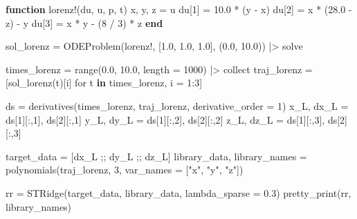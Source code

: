 \documentclass[
]{article}
\newenvironment{Shaded}{\begin{snugshade}}{\end{snugshade}}
\newcommand{\FloatTok}[1]{\textcolor[rgb]{0.68,0.00,0.00}{#1}}
\newcommand{\FunctionTok}[1]{\textcolor[rgb]{0.28,0.35,0.67}{#1}}
\newcommand{\KeywordTok}[1]{\textcolor[rgb]{0.00,0.23,0.31}{\textbf{#1}}}
\newcommand{\NormalTok}[1]{\textcolor[rgb]{0.00,0.23,0.31}{#1}}
\newcommand{\OperatorTok}[1]{\textcolor[rgb]{0.37,0.37,0.37}{#1}}
\newcommand{\StringTok}[1]{\textcolor[rgb]{0.13,0.47,0.30}{#1}}
\begin{document}
\begin{Shaded}
\begin{Highlighting}[]
\KeywordTok{function} \FunctionTok{lorenz!}\NormalTok{(du, u, p, t)}
\NormalTok{    x, y, z }\OperatorTok{=}\NormalTok{ u}
\NormalTok{    du[}\FloatTok{1}\NormalTok{] }\OperatorTok{=} \FloatTok{10.0} \OperatorTok{*}\NormalTok{ (y }\OperatorTok{{-}}\NormalTok{ x)}
\NormalTok{    du[}\FloatTok{2}\NormalTok{] }\OperatorTok{=}\NormalTok{ x }\OperatorTok{*}\NormalTok{ (}\FloatTok{28.0} \OperatorTok{{-}}\NormalTok{ z) }\OperatorTok{{-}}\NormalTok{ y}
\NormalTok{    du[}\FloatTok{3}\NormalTok{] }\OperatorTok{=}\NormalTok{ x }\OperatorTok{*}\NormalTok{ y }\OperatorTok{{-}}\NormalTok{ (}\FloatTok{8} \OperatorTok{/} \FloatTok{3}\NormalTok{) }\OperatorTok{*}\NormalTok{ z}
\KeywordTok{end}

\NormalTok{sol\_lorenz }\OperatorTok{=} \FunctionTok{ODEProblem}\NormalTok{(lorenz!, [}\FloatTok{1.0}\NormalTok{, }\FloatTok{1.0}\NormalTok{, }\FloatTok{1.0}\NormalTok{], (}\FloatTok{0.0}\NormalTok{, }\FloatTok{10.0}\NormalTok{)) }\OperatorTok{|\textgreater{}}\NormalTok{ solve}

\NormalTok{times\_lorenz }\OperatorTok{=} \FunctionTok{range}\NormalTok{(}\FloatTok{0.0}\NormalTok{, }\FloatTok{10.0}\NormalTok{, length }\OperatorTok{=} \FloatTok{1000}\NormalTok{) }\OperatorTok{|\textgreater{}}\NormalTok{ collect}
\NormalTok{traj\_lorenz }\OperatorTok{=}\NormalTok{ [}\FunctionTok{sol\_lorenz}\NormalTok{(t)[i] for t }\KeywordTok{in}\NormalTok{ times\_lorenz, i }\OperatorTok{=} \FloatTok{1}\OperatorTok{:}\FloatTok{3}\NormalTok{]}

\NormalTok{ds }\OperatorTok{=} \FunctionTok{derivatives}\NormalTok{(times\_lorenz, traj\_lorenz, derivative\_order }\OperatorTok{=} \FloatTok{1}\NormalTok{)}
\NormalTok{x\_L, dx\_L }\OperatorTok{=}\NormalTok{ ds[}\FloatTok{1}\NormalTok{][}\OperatorTok{:}\NormalTok{,}\FloatTok{1}\NormalTok{], ds[}\FloatTok{2}\NormalTok{][}\OperatorTok{:}\NormalTok{,}\FloatTok{1}\NormalTok{]}
\NormalTok{y\_L, dy\_L }\OperatorTok{=}\NormalTok{ ds[}\FloatTok{1}\NormalTok{][}\OperatorTok{:}\NormalTok{,}\FloatTok{2}\NormalTok{], ds[}\FloatTok{2}\NormalTok{][}\OperatorTok{:}\NormalTok{,}\FloatTok{2}\NormalTok{]}
\NormalTok{z\_L, dz\_L }\OperatorTok{=}\NormalTok{ ds[}\FloatTok{1}\NormalTok{][}\OperatorTok{:}\NormalTok{,}\FloatTok{3}\NormalTok{], ds[}\FloatTok{2}\NormalTok{][}\OperatorTok{:}\NormalTok{,}\FloatTok{3}\NormalTok{]}

\NormalTok{target\_data }\OperatorTok{=}\NormalTok{ [dx\_L ;; dy\_L ;; dz\_L]}
\NormalTok{library\_data, library\_names }\OperatorTok{=} \FunctionTok{polynomials}\NormalTok{(traj\_lorenz, }\FloatTok{3}\NormalTok{, var\_names }\OperatorTok{=}\NormalTok{ [}\StringTok{"x"}\NormalTok{, }\StringTok{"y"}\NormalTok{, }\StringTok{"z"}\NormalTok{])}

\NormalTok{rr }\OperatorTok{=} \FunctionTok{STRidge}\NormalTok{(target\_data, library\_data, lambda\_sparse }\OperatorTok{=} \FloatTok{0.3}\NormalTok{)}
\FunctionTok{pretty\_print}\NormalTok{(rr, library\_names)}
\end{Highlighting}
\end{Shaded}
\end{document}
